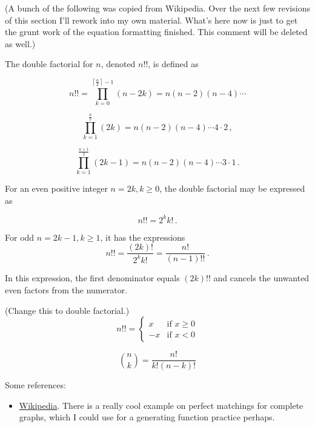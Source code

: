 \documentclass{article}
\begin{document}
(A bunch of the following was copied from Wikipedia. Over the next few
revisions of this section I'll rework into my own material. What's here
now is just to get the grunt work of the equation formatting finished.
This comment will be deleted as well.)

The double factorial for $n$, denoted $n!!$, is defined as

\begin{equation}
  n!! = \prod_{k=0}^{\left\lceil\frac{n}{2}\right\rceil - 1} (n-2k) = n (n-2) (n-4) \cdots
\end{equation}

\begin{equation}
  \prod_{k=1}^\frac{n}{2} (2k) = n(n-2)(n-4)\cdots 4\cdot 2\,,
\end{equation}

\begin{equation}
  \prod_{k=1}^\frac{n+1}{2} (2k-1) = n(n-2)(n-4)\cdots 3\cdot 1 \,.
\end{equation}

For an even positive integer $n = 2k, k \geq 0$, the double factorial may be expressed as

\begin{equation}
{\displaystyle n!!=2^{k}k!\,.}
\end{equation}

For odd $n = 2k - 1, k \geq 1$, it has the expressions
\begin{equation}
{\displaystyle n!!={\frac {(2k)!}{2^{k}k!}}={\frac {n!}{(n-1)!!}}\,.}
\end{equation}

In this expression, the first denominator equals $(2k)!!$
and cancels the unwanted even factors from the numerator.


(Change this to double factorial.)
\begin{equation}
n!! = \begin{cases}
  x & \text{if } x \geq 0 \\
 -x & \text{if } x < 0
\end{cases}
\end{equation}

\[
  \binom{n}{k} = \frac{n!}{k!(n-k)!}
\]

Some references:

\begin{itemize}
  \item \href{https://en.wikipedia.org/wiki/Double\_factorial}{Wikipedia}. There is a
    really cool example on perfect matchings for complete graphs, which I could use
    for a generating function practice perhaps.
\end{itemize}
\end{document}
